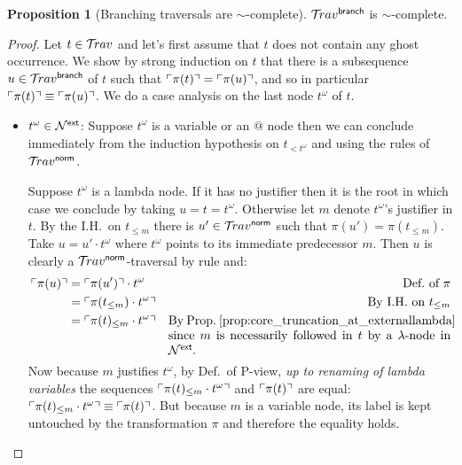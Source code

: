 \documentclass{article}
\theoremstyle{definition}
\newtheorem{proposition}{Proposition}[section]
\newcommand\Nodes{\mathcal{N}}%
\newcommand{\normalizing}{{\sf norm}}
\newcommand{\branching}{{\sf branch}}
\newcommand{\travsetbr}{{\travset^\branching}}
\newcommand{\travsetnorm}{\travset^\normalizing}
\newcommand{\travulc}{\travset}
\def\coresymbol{\pi} %
\newcommand{\core}[1]{\coresymbol(#1)} %
\newcommand{\ExtNodes}{\Nodes^{\sf ext}}
\begin{document}
\begin{proposition}[Branching traversals are $\sim$-complete]
\label{prop:branching_traversal_simcomplete}
  $\travsetbr$ is  $\sim$-complete.
\end{proposition}
\begin{proof}
Let $t\in\travulc$ and let's first assume that $t$ does not contain any ghost occurrence. We show by strong induction on $t$ that there is a subsequence $u\in\travsetbr$ of $t$ such that $\pview{\core{t}} = \pview{\core{u}}$, and so in particular
$\pview{\core{t}} \equiv \pview{\core{u}}$.
We do a case analysis on the last node $t^\omega$ of $t$.
\begin{itemize}
\item $t^\omega\in \ExtNodes$: Suppose $t^\omega$ is a variable or an $@$ node then we can conclude immediately from the induction hypothesis on $t_{<t^\omega}$ and using the rules  of $\travsetnorm$.

Suppose $t^\omega$ is a lambda node. If it has no justifier then it is the root in which case we conclude by taking  $u=t=t^\omega$. Otherwise let $m$ denote $t^\omega$'s justifier in $t$. By the I.H.~on $t_{\leq m}$ there is $u' \in \travsetnorm$ such that $\core{u'} = \core{t_{\leq m}}$. Take $u = u' \cdot t^\omega$ where $t^\omega$ points to its immediate predecessor $m$. Then $u$ is clearly a $\travsetnorm$-traversal by rule  and:
\begin{align*}
\pview{\core{u}} &= \pview{\core{u'}} \cdot t^\omega & \mbox{Def.~of $\coresymbol$}\\
 &= \pview{\core{t_{\leq m}} \cdot t^\omega} & \mbox{By I.H.~on $t_{\leq m}$}\\
 &= \pview{\core{t}_{\leq m} \cdot t^\omega} & \parbox[t]{8cm}{By Prop.~\ref{prop:core_truncation_at_externallambda} since $m$ is necessarily followed in $t$ by a $\lambda$-node in $\ExtNodes$.}
\end{align*}
Now because $m$ justifies $t^\omega$, by Def.~of P-view, \emph{up to renaming of lambda variables} the sequences $\pview{\core{t}_{\leq m} \cdot t^\omega}$ and $\pview{\core{t}}$ are equal: $\pview{\core{t}_{\leq m} \cdot t^\omega} \equiv \pview{\core{t}}$.
 But because $m$ is a variable node, its label is kept untouched by the transformation $\coresymbol$ and therefore the equality holds.


\end{itemize}
\end{proof}
\end{document}
